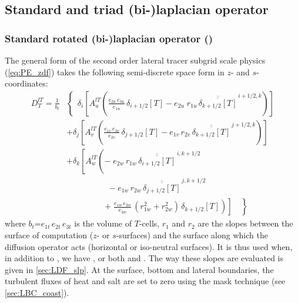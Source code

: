 \documentclass[../main/NEMO_manual]{subfiles}
\begin{document}
\subsection{Standard and triad (bi-)laplacian operator}
\label{subsec:TRA_ldf_iso_triad}

\subsubsection{Standard rotated (bi-)laplacian operator (\protect{})}
\label{subsec:TRA_ldf_iso}

The general form of the second order lateral tracer subgrid scale physics (\autoref{eq:PE_zdf})
takes the following semi-discrete space form in $z$- and $s$-coordinates:
\begin{equation}
  \label{eq:tra_ldf_iso}
  \begin{split}
    D_T^{lT} = \frac{1}{b_t}   & \left\{   \,\;\delta_i \left[   A_u^{lT}  \left(
          \frac{e_{2u}\,e_{3u}}{e_{1u}} \,\delta_{i+1/2}[T]
          - e_{2u}\;r_{1u} \,\overline{\overline{ \delta_{k+1/2}[T] }}^{\,i+1/2,k}
        \right)   \right]   \right.    \\
    &             +\delta_j \left[ A_v^{lT} \left(
        \frac{e_{1v}\,e_{3v}}{e_{2v}}  \,\delta_{j+1/2} [T]
        - e_{1v}\,r_{2v} \,\overline{\overline{ \delta_{k+1/2} [T] }}^{\,j+1/2,k}
      \right)   \right]                 \\
    & +\delta_k \left[ A_w^{lT} \left(
        -\;e_{2w}\,r_{1w} \,\overline{\overline{ \delta_{i+1/2} [T] }}^{\,i,k+1/2}
      \right.   \right.                 \\
    & \qquad \qquad \quad
    - e_{1w}\,r_{2w} \,\overline{\overline{ \delta_{j+1/2} [T] }}^{\,j,k+1/2}     \\
    & \left. {\left. {   \qquad \qquad \ \ \ \left. {
                +\;\frac{e_{1w}\,e_{2w}}{e_{3w}} \,\left( r_{1w}^2 + r_{2w}^2 \right)
                \,\delta_{k+1/2} [T] } \right) } \right] \quad } \right\}
  \end{split}
\end{equation}
where $b_t$=$e_{1t}\,e_{2t}\,e_{3t}$  is the volume of $T$-cells,
$r_1$ and $r_2$ are the slopes between the surface of computation ($z$- or $s$-surfaces) and
the surface along which the diffusion operator acts (\ie horizontal or iso-neutral surfaces).
It is thus used when, in addition to ,
we have ,
or both  and .
The way these slopes are evaluated is given in \autoref{sec:LDF_slp}.
At the surface, bottom and lateral boundaries, the turbulent fluxes of heat and salt are set to zero using
the mask technique (see \autoref{sec:LBC_coast}). 
\end{document}
